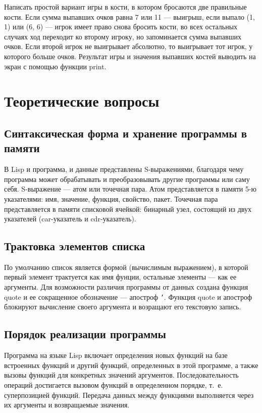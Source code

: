 Написать простой вариант игры в кости, в котором бросаются две правильные
кости. Если сумма выпавших очков равна 7 или 11 --- выигрыш, если выпало (1, 1)
или (6, 6) --- игрок имеет право снова бросить кости, во всех остальных
случаях ход переходит ко второму игроку, но запоминается сумма выпавших очков.
Если второй игрок не выигрывает абсолютно, то выигрывает тот игрок, у которого
больше очков. Результат игры и значения выпавших костей выводить на экран
с помощью функции print.


\chapter{Теоретические вопросы}

\section{Синтаксическая форма и хранение программы в памяти}

В Lisp и программа, и данные представлены S-выражениями, благодаря чему
программа может обрабатывать и преобразовывать другие программы или саму себя.
S-выражение --- атом или точечная пара. Атом представляется в памяти 5-ю
указателями: имя, значение, функция, свойство, пакет. Точечная пара
представляется в памяти списковой ячейкой: бинарный узел, состоящий из двух
указателей (car-указатель и cdr-указатель).

\section{Трактовка элементов списка}

По умолчанию список является формой (вычислимым выражением), в которой первый
элемент трактуется как имя фунции, остальные элементы --- как ее аргументы.  Для
возможности различия программы от данных создана функция quote и ее сокращенное
обозначение --- апостроф \texttt{'}. Функция quote и апостроф блокируют
вычисление своего аргумента и возращают его текстовую запись.

\section{Порядок реализации программы}

Программа на языке Lisp включает определения новых функций на базе встроенных
функций и другий функций, определенных в этой программе, а также вызовы функций
для конкретных значений аргументов. Последовательность операций достигается
вызовом функций в определенном порядке, т.~е. суперпозицией функций. Передача
данных между функциями выполняется через их аргументы и возвращаемые значения.


